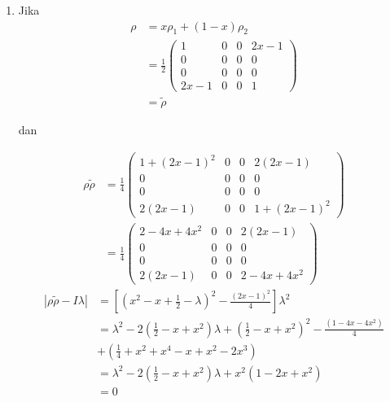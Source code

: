 \begin{enumerate}
	\item Jika
	\begin{equation}
		\begin{aligned}
			\rho
			&=x\rho_1+(1-x)\rho_2\\
			&=\frac{1}{2}
			\begin{pmatrix}
				1&0&0&2x-1\\
				0&0&0&0\\
				0&0&0&0\\
				2x-1&0&0&1
			\end{pmatrix}\\
			&=\tilde{\rho}
		\end{aligned}
	\end{equation}
	
	dan
	
	\begin{equation}
		\begin{aligned}
			\rho \tilde{\rho}
			&=\frac{1}{4}
			\begin{pmatrix}
				1+(2x-1)^2&0&0&2(2x-1)\\
				0&0&0&0\\
				0&0&0&0\\
				2(2x-1)&0&0&1+(2x-1)^2
			\end{pmatrix}\\
			&=\frac{1}{4}
			\begin{pmatrix}
				2-4x+4x^2&0&0&2(2x-1)\\
				0&0&0&0\\
				0&0&0&0\\
				2(2x-1)&0&0&2-4x+4x^2
			\end{pmatrix}
		\end{aligned}
	\end{equation}
	\begin{equation}
		\begin{aligned}
			|\rho \tilde{\rho}-I\lambda|
			&=[(x^2-x+\frac{1}{2}-\lambda)^2-\frac{(2x-1)^2}{4}]\lambda^2\\
			&=\lambda^2-2(\frac{1}{2}-x+x^2)\lambda+(\frac{1}{2}-x+x^2)^2-\frac{(1-4x-4x^2)}{4}\\
			&+(\frac{1}{4}+x^2+x^4-x+x^2-2x^3)\\
			&=\lambda^2-2(\frac{1}{2}-x+x^2)\lambda+x^2(1-2x+x^2)\\
			&=0
		\end{aligned}
	\end{equation}
	

\end{enumerate}
